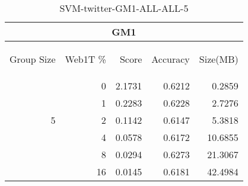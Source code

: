 \begin{center}
\begin{table}[htbp] 
 \begin{center}
\begin{tabular}{ | r | r | r | r | r |}
\hline
\multicolumn{5}{|c|}{GM1}\\
\hline
\begin{sideways}Group Size\end{sideways} & \begin{sideways}Web1T \%\end{sideways} & \begin{sideways}Score\end{sideways} & \begin{sideways}Accuracy\end{sideways} & \begin{sideways}Size(MB)\end{sideways}\\
\hline
\multirow{5}{*}{5}
 & 0 & 2.1731 & 0.6212 & 0.2859\\ \cline{2-5}
 & 1 & 0.2283 & 0.6228 & 2.7276\\ \cline{2-5}
 & 2 & 0.1142 & 0.6147 & 5.3818\\ \cline{2-5}
 & 4 & 0.0578 & 0.6172 & 10.6855\\ \cline{2-5}
 & 8 & 0.0294 & 0.6273 & 21.3067\\ \cline{2-5}
 & 16 & 0.0145 & 0.6181 & 42.4984\\ \cline{2-5}
\hline
\end{tabular}
\caption{SVM-twitter-GM1-ALL-ALL-5}
\label{table:SVM-twitter-GM1-ALL-ALL-5}
\end{center}
 \end{table}
\end{center}

